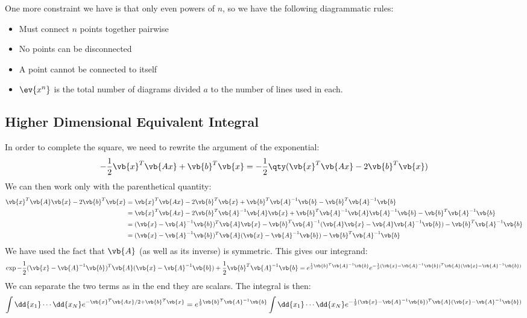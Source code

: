 \documentclass[12pt]{article}
\def\A{\vb{A}}
\begin{document}
One more constraint we have is that only even powers of $n$, so we have the following diagrammatic rules:
\begin{itemize}
\item Must connect $n$ points together pairwise
\item No points can be disconnected
\item A point cannot be connected to itself
\item $\ev{x^n}$ is the total number of diagrams divided $a$ to the number of lines used in each.
\end{itemize}

\subsection{Higher Dimensional Equivalent Integral}
In order to complete the square, we need to rewrite the argument of the exponential:
\begin{align*}
  -\frac12\vb{x}^T\vb{Ax}+\vb{b}^T\vb{x}=-\frac12\qty(\vb{x}^T\vb{Ax}-2\vb{b}^T\vb{x})
\end{align*}
We can then work only with the parenthetical quantity:
\begin{align*}
  \vb{x}^T\A\vb{x}-2\vb{b}^T\vb{x}
  &=\vb{x}^T\vb{Ax}-2\vb{b}^T\vb{x}+\vb{b}^T\A^{-1}\vb{b}-\vb{b}^T\A^{-1}\vb{b}\\
  &=\vb{x}^T\vb{Ax}-2\vb{b}^T\A^{-1}\A\vb{x}+
  \vb{b}^T\A^{-1}\A\A^{-1}\vb{b}-\vb{b}^T\A^{-1}\vb{b}\\
  &=(\vb{x}-\A^{-1}\vb{b})^T\A\vb{x}
  -\vb{b}^T\A^{-1}(\A\vb{x}-\A\A^{-1}\vb{b})-\vb{b}^T\A^{-1}\vb{b}\\
  &=(\vb{x}-\A^{-1}\vb{b})^T\A(\vb{x}-\A^{-1}\vb{b})-\vb{b}^T\A^{-1}\vb{b}
\end{align*}
We have used the fact that $\A$ (as well as its inverse) is symmetric. This gives our integrand:
\begin{align*}
  \exp{-\frac12(\vb{x}-\A^{-1}\vb{b})^T\A(\vb{x}-\A^{-1}\vb{b})+\frac12\vb{b}^T\A^{-1}\vb{b}}
  =e^{\frac12\vb{b}^T\A^{-1}\vb{b}}
  e^{-\frac12(\vb{x}-\A^{-1}\vb{b})^T\A(\vb{x}-\A^{-1}\vb{b})}
\end{align*}
We can separate the two terms as in the end they are scalars. The integral is then:
\begin{align*}
  \int\dd{x_1}\cdots\dd{x_N}e^{-\vb{x}^T\vb{Ax}/2+\vb{b}^T\vb{x}}
  =e^{\frac12\vb{b}^T\A^{-1}\vb{b}}\int\dd{x_1}\cdots\dd{x_N}
  e^{-\frac12(\vb{x}-\A^{-1}\vb{b})^T\A(\vb{x}-\A^{-1}\vb{b})}
\end{align*}
\end{document}
